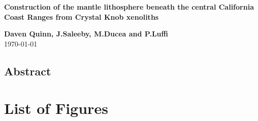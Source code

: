 \documentclass[letterpaper,12pt]{article}
\begin{document}
\begin{spacing}{0.8}\noindent\Gotham\Large\textbf{Construction of the mantle lithosphere beneath
the central California Coast Ranges from Crystal Knob xenoliths}\end{spacing}
{\noindent\GothamLight\normalsize\textbf{Daven Quinn, J.Saleeby, M.Ducea and P.Luffi}}\\
{\noindent\GothamLight\normalsize\today}\\


\begin{spacing}{1.2}

\section*{Abstract}




\end{spacing}




\pagebreak

\setcounter{secnumdepth}{-1}
\begin{spacing}{1.2}
\begin{appendices}

\end{appendices}
\end{spacing}


\pagebreak

\section{List of Figures}



\pagebreak

\tableofcontents
\end{document}
